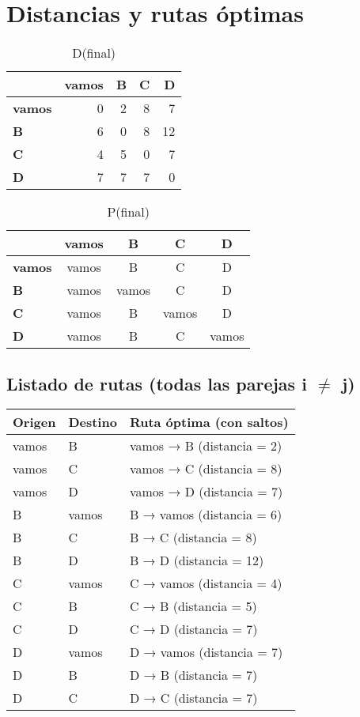 \documentclass{article}
\begin{document}
\section*{Distancias y rutas óptimas}
\begin{table}[H]\centering
\caption{D(final)}
\begin{tabular}{l r r r r}
\toprule
 & \textbf{vamos} & \textbf{B} & \textbf{C} & \textbf{D}\\\midrule
\textbf{vamos} & 0 & 2 & 8 & 7 \\
\textbf{B} & 6 & 0 & 8 & 12 \\
\textbf{C} & 4 & 5 & 0 & 7 \\
\textbf{D} & 7 & 7 & 7 & 0 \\
\bottomrule
\end{tabular}
\end{table}

\begin{table}[H]\centering
\caption{P(final)}
\begin{tabular}{l c c c c}
\toprule
 & \textbf{vamos} & \textbf{B} & \textbf{C} & \textbf{D}\\\midrule
\textbf{vamos} & vamos & B & C & D \\
\textbf{B} & vamos & vamos & C & D \\
\textbf{C} & vamos & B & vamos & D \\
\textbf{D} & vamos & B & C & vamos \\
\bottomrule
\end{tabular}
\end{table}

\subsection*{Listado de rutas (todas las parejas i $\neq$ j)}
\begin{longtable}{llp{}}
\toprule
\textbf{Origen} & \textbf{Destino} & \textbf{Ruta óptima (con saltos)}\\\midrule
vamos & B & vamos → B (distancia = 2)\\
vamos & C & vamos → C (distancia = 8)\\
vamos & D & vamos → D (distancia = 7)\\
B & vamos & B → vamos (distancia = 6)\\
B & C & B → C (distancia = 8)\\
B & D & B → D (distancia = 12)\\
C & vamos & C → vamos (distancia = 4)\\
C & B & C → B (distancia = 5)\\
C & D & C → D (distancia = 7)\\
D & vamos & D → vamos (distancia = 7)\\
D & B & D → B (distancia = 7)\\
D & C & D → C (distancia = 7)\\
\bottomrule
\end{longtable}
\end{document}
